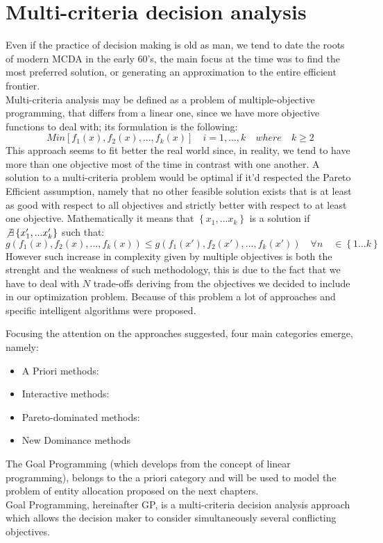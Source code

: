 \documentclass{article}
\begin{document}
\section{Multi-criteria decision analysis}
Even if the practice of decision making is old as man, we tend to date the roots of modern MCDA in the early 60's, the main focus at the time was to find the most preferred solution, or generating an approximation to the entire efficient frontier\cite{greco_multiple_2016}.
\\
Multi-criteria analysis may be defined as a problem of multiple-objective programming, that differs from a linear one,
since we have more objective functions to deal with; its formulation is the following:
$$
Min[f_1(x),f_2(x),...,f_k(x)] \quad i=1,...,k \quad where \quad k\geq2
$$
This approach seems to fit better the real world since, in reality, we tend to have more than one objective most of the time in contrast with one another.
A solution to a multi-criteria problem would be optimal if it'd respected the Pareto Efficient assumption, namely that no other feasible solution exists that is at least as good with respect to all objectives and strictly better with respect to at least one objective. Mathematically it means that $\left\{x_1,...x_k\right\}$ is a solution if $\not\exists \left\{x'_1,...x'_k\right\}$
such that:
\[
g(f_1(x),f_2(x),...,f_k(x)) \leq g(f_1(x'),f_2(x'),...,f_k(x')) \quad \forall n \quad \in  \left\{1...k\right\}
\]
However such increase in complexity given by multiple objectives is both the strenght and the weakness of such methodology, this is due to the fact that we have to deal with $N$ trade-offs deriving from the objectives we decided to include in our optimization problem. Because of this problem a lot of approaches and specific intelligent algorithms were proposed\cite{Cui2017}.

Focusing the attention on the approaches suggested, four main categories emerge, namely:
\begin{itemize}
	\item A Priori methods:
	\item Interactive methods:
	\item Pareto-dominated methods:
	\item New Dominance methods
\end{itemize}

The Goal Programming (which develops from the concept of linear programming), belongs to the a priori category and will be used to model the problem of entity allocation proposed on the next chapters.
\\
Goal Programming, hereinafter GP, is a multi-criteria decision analysis approach which allows the decision maker to consider simultaneously several conflicting objectives.
\end{document}
